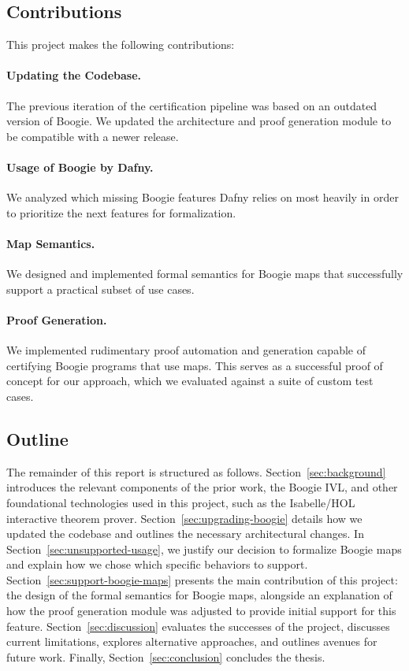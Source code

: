 \documentclass[11pt]{article}
\begin{document}
\subsection{Contributions}

This project makes the following contributions:

\paragraph{Updating the Codebase.} The previous iteration of the certification pipeline was based on an outdated version of Boogie.
We updated the architecture and proof generation module to be compatible with a newer release.

\paragraph{Usage of Boogie by Dafny.} We analyzed which missing Boogie features Dafny relies on most heavily in order to prioritize the next features for formalization.

\paragraph{Map Semantics.} We designed and implemented formal semantics for Boogie maps that successfully support a practical subset of use cases.

\paragraph{Proof Generation.} We implemented rudimentary proof automation and generation capable of certifying Boogie programs that use maps. 
This serves as a successful proof of concept for our approach, which we evaluated against a suite of custom test cases.


\subsection{Outline}
The remainder of this report is structured as follows.
Section~\ref{sec:background} introduces the relevant components of the prior work, the Boogie IVL,
and other foundational technologies used in this project, such as the Isabelle/HOL interactive theorem prover. 
Section~\ref{sec:upgrading-boogie} details how we updated the codebase and outlines the necessary architectural changes. 
In Section~\ref{sec:unsupported-usage}, we justify our decision to formalize Boogie maps and explain how we chose which specific behaviors to support. 
Section~\ref{sec:support-boogie-maps} presents the main contribution of this project:
the design of the formal semantics for Boogie maps, alongside an explanation of
how the proof generation module was adjusted to provide initial support for this feature. 
Section~\ref{sec:discussion} evaluates the successes of the project,
discusses current limitations, explores alternative approaches, and outlines avenues for future work. 
Finally, Section~\ref{sec:conclusion} concludes the thesis.
\end{document}
